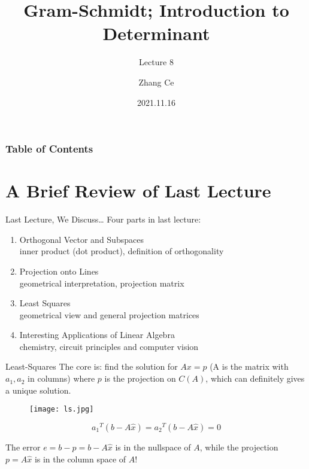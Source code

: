 \documentclass{beamer}
\title[Linear Algebra] %
{Gram-Schmidt; Introduction to Determinant}
\subtitle{Lecture 8}
\author[11910803@mail.sustech.edu.cn] %
{
    Zhang Ce
}
\institute[] %
{
    Department of Electrical and Electronic Engineering\\
    Southern University of Science and Technology
}
\date[2021.11.16] %
{2021.11.16}
\begin{document}
\frame{\titlepage}


\begin{frame}
\frametitle{Table of Contents}
\tableofcontents
\end{frame}
\section{A Brief Review of Last Lecture}
\begin{frame}{Last Lecture, We Discuss\dots}
Four parts in last lecture:
    \begin{enumerate}
        \item Orthogonal Vector and Subspaces\\
        inner product (dot product), definition of orthogonality
        \item Projection onto Lines\\
        geometrical interpretation, projection matrix
        \item Least Squares\\
        geometrical view and general projection matrices
        \item Interesting Applications of Linear Algebra\\
        chemistry, circuit principles and computer vision
    \end{enumerate}

\end{frame}

\begin{frame}{Least-Squares}
The core is: find the solution for $Ax=p$ (A is the matrix with $a_1,a_2$ in columns) where $p$ is the projection on $C(A)$, which can definitely gives a unique solution.

\begin{figure}
    \centering
    \texttt{[image: ls.jpg]}
\end{figure}
\begin{equation*}
    {a_1}^T\left( b-A\hat{x} \right) ={a_2}^T\left( b-A\hat{x} \right) =0
\end{equation*}

The error $e=b-p=b-A\hat{x}$ is in the nullspace of $A$, while the projection $p=A\hat{x}$ is in the column space of $A$!
\end{frame}
\end{document}
